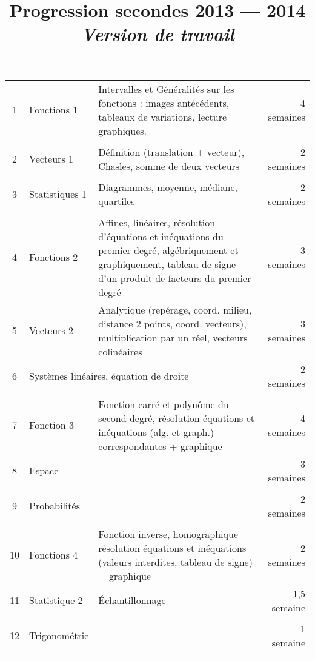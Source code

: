 \documentclass[landscape,11pt]{article}
\title{Progression secondes 2013 --- 2014\\\emph{\normalsize Version de travail}}
\author{}
\date{}
\begin{document}
\maketitle
\thispagestyle{empty}

\begin{tabularx}{\textwidth}{c|lXr}
1 &
Fonctions 1 & Intervalles et Généralités sur les fonctions : images antécédents, tableaux de variations, lecture graphiques. &
4 semaines\\\\\hline

2 &
Vecteurs 1 & Définition (translation + vecteur), Chasles, somme de deux vecteurs &
2 semaines
\\\\\hline

3 &
Statistiques 1 & Diagrammes, moyenne, médiane, quartiles &
2 semaines
\\\\\hline

4 &
Fonctions 2 & Affines, linéaires, résolution d’équations et inéquations du premier degré, algébriquement et graphiquement, tableau de signe d’un produit de facteurs du premier degré &
3 semaines	
\\\hline

5 &
Vecteurs 2 & Analytique (repérage, coord. milieu, distance 2 points, coord. vecteurs), multiplication par un réel, vecteurs colinéaires &
3 semaines
\\\hline

6 &
\multicolumn{2}{l}{Systèmes linéaires, équation de droite} &
2 semaines
\\\\\hline

7 &
Fonction 3 & Fonction carré et polynôme du second degré, résolution équations et inéquations (alg. et graph.) correspondantes + graphique &
4 semaines
\\\hline

8 &
Espace & &
3 semaines
\\\\\hline

9 &
Probabilités & &
2 semaines
\\\\\hline

10 &
Fonctions 4 & Fonction inverse, homographique résolution équations et inéquations (valeurs interdites, tableau de signe) + graphique &
2 semaines
\\\hline

11 &
Statistique 2 & Échantillonnage &
1,5 semaine
\\\\\hline

12 &
Trigonométrie &&
1 semaine
\\\\

\end{tabularx}
\end{document}
